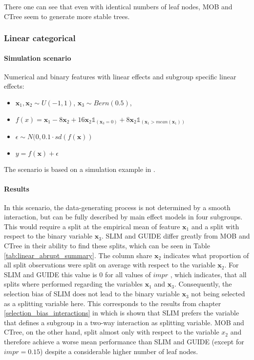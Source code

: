 There one can see that even with identical numbers of leaf nodes, MOB and CTree seem to generate more stable trees.






\subsubsection{Linear categorical} 

\paragraph{Simulation scenario}
Numerical and binary features with linear effects and subgroup specific linear effects:
\begin{itemize}
    \item $\textbf{x}_1, \textbf{x}_2 \sim U(-1,1)$, $\textbf{x}_3 \sim Bern(0.5)$,  
    \item $ f(x) =  \textbf{x}_{1} - 8  \textbf{x}_2 + 16  \textbf{x}_2  \mathbb{1}_{(\textbf{x}_3 = 0)} + 8  \textbf{x}_2  \mathbb{1}_{(\textbf{x}_1 > mean(\textbf{x}_1))} $
    \item $\epsilon \sim N(0, 0.1 \cdot sd(f(\textbf{x}))$
    \item $y = f(\textbf{x}) + \epsilon$          
\end{itemize}

The scenario is based on a simulation example in \citep{Herbinger.2022}.

\paragraph{Results}
In this scenario, the data-generating process is not determined by a smooth interaction, but can be fully described by main effect models in four subgroups.
This would require a split at the empirical mean of  feature $\textbf{x}_1$ and a split with respect to the binary variable $\textbf{x}_3$. 
SLIM and GUIDE differ greatly from MOB and CTree in their ability to find these splits, which can be seen in Table \ref{tab:linear_abrupt_summary}. 
The column share $\textbf{x}_2$ indicates what proportion of all split observations were split on average with respect to the variable $\textbf{x}_2$.
For SLIM and GUIDE this value is $0$ for all values of $impr$ , which indicates, that all splits where performed regarding the variables $\textbf{x}_1$ and $\textbf{x}_3$.  Consequently, the selection bias of SLIM does not lead to the binary variable $\textbf{x}_3$ not being selected as a splitting variable here. This corresponds to the results from chapter \ref{selection_bias_interactions} in which is shown that SLIM prefers the variable that defines a subgroup in a two-way interaction as  splitting variable.
MOB and CTree, on the other hand, split almost only with respect to the variable $x_2$ and therefore achieve a worse mean performance than SLIM and GUIDE (except for $impr = 0.15$) despite a considerable higher number of leaf nodes.

